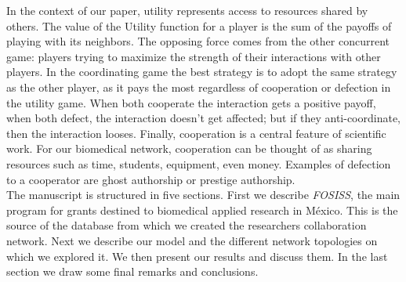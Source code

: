 \documentclass[11pt]{article}
\begin{document}
In the context of our paper, utility represents
  access to resources shared by others.
  The value of the Utility function for a player is the sum of the payoffs of playing
  with its neighbors. The opposing force comes from the other concurrent game: players
  trying to maximize the strength of their interactions with other players. In the coordinating game
  the best strategy is to adopt the same strategy as the other player, as it pays the most
  regardless of cooperation or defection in the utility game. When
  both cooperate the interaction gets a positive payoff, when both defect, the
  interaction doesn't get affected; but if they anti-coordinate, then the
  interaction looses. Finally, cooperation is a central feature of scientific work.
  For our biomedical network, cooperation can be thought of
  as sharing resources such as time, students, equipment, even money. Examples of defection
  to a cooperator are ghost authorship or
  prestige authorship.\\



The manuscript is structured in five sections. First we describe
\textit{FOSISS}, the main program for grants destined to biomedical applied
research in M\'exico. This is the source of the
database from which we created the researchers collaboration network. Next we
describe our model
and the different network topologies on which we explored it.
We then present our results and discuss them. In the last section
we draw some final remarks and conclusions.




\end{document}
